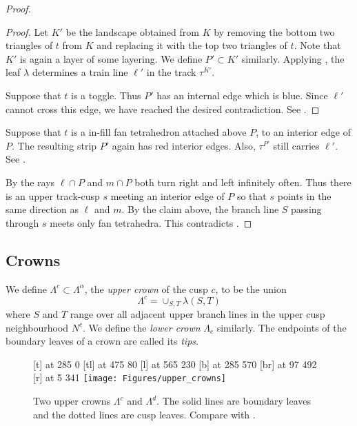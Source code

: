 \documentclass[12pt]{amsart}
\begin{document}
\begin{proof}
\begin{proof}
Let $K'$ be the landscape obtained from $K$ by removing the bottom two triangles of $t$ from $K$ and replacing it with the top two triangles of $t$.  Note that $K'$ is again a layer of some layering.  We define $P' \subset K'$ similarly.  Applying , the leaf $\lambda$ determines a train line $\ell'$ in the track $\tau^{K'}$.  

Suppose that $t$ is a toggle.  Thus $P'$ has an internal edge which is blue.  Since $\ell'$ cannot cross this edge, we have reached the desired contradiction.  See .  
\end{proof}

Suppose that $t$ is a in-fill fan tetrahedron attached above $P$, to an interior edge of $P$.  The resulting strip $P'$ again has red interior edges.  Also, $\tau^{P'}$ still carries $\ell'$.  See .  


By  the rays $\ell \cap P$ and $m \cap P$ both turn right and left infinitely often.  Thus there is an upper track-cusp $s$ meeting an interior edge of $P$ so that $s$ points in the same direction as $\ell$ and $m$.  By the claim above, the branch line $S$ passing through $s$ meets only fan tetrahedra.  This contradicts .
\end{proof}

\subsection{Crowns}

\begin{definition}
\label{Def:Crown}
We define $\Lambda^c \subset \Lambda^\alpha$, the \emph{upper crown} of the cusp $c$, to be the union 
\[ 
\Lambda^c = \cup_{S, T} \lambda(S, T) 
\]
where $S$ and $T$ range over all adjacent upper branch lines in the upper cusp neighbourhood $N^c$.  We define the \emph{lower crown} $\Lambda_c$ similarly.  The endpoints of the boundary leaves of a crown are called its \emph{tips}.
\end{definition}

\begin{figure}[htbp]
\small\hair 2pt
 [t] at 285 0
 [tl] at 475 80
 [l] at 565 230
 [b] at 285 570
 [br] at 97 492
 [r] at 5 341
\endlabellist
\texttt{[image: Figures/upper\_crowns]}
\caption{Two upper crowns $\Lambda^c$ and $\Lambda^d$.  The solid lines are boundary leaves and the dotted lines are cusp leaves. Compare with .}
\label{Fig:UpperCrowns}
\end{figure}
\end{document}
